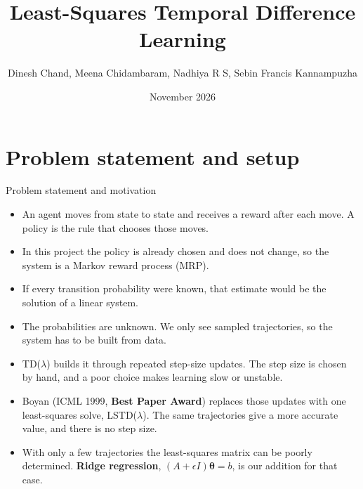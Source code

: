 \documentclass[aspectratio=169,11pt]{beamer}
\title{Least-Squares Temporal Difference Learning}
\author{Dinesh Chand, Meena Chidambaram, Nadhiya R S, Sebin Francis Kannampuzha}
\date{November 2026}
\newcommand{\memberA}{Member A}
\newcommand{\darkbg}{\fill[ink] (current page.south west) rectangle (current page.north east);}
\newcommand{\speaker}[1]{} %
\newcommand{\hl}[1]{\textcolor{accent}{\textbf{#1}}}
\newcommand{\vth}{\bm{\theta}}
\begin{document}
\begin{frame}
\end{frame}

\section{Problem statement and setup}

\begin{frame}{Problem statement and motivation}
  \speaker{\memberA}
  \small
  \begin{itemize}
    \item An agent moves from state to state and receives a reward after each move. A policy is the rule that chooses those moves.
    \item In this project the policy is already chosen and does not change, so the system is a Markov reward process (MRP).
    \item If every transition probability were known, that estimate would be the solution of a linear system.
    \item The probabilities are unknown. We only see sampled trajectories, so the system has to be built from data.
    \item TD($\lambda$) builds it through repeated step-size updates. The step size is chosen by hand, and a poor choice makes learning slow or unstable.
    \item Boyan (ICML 1999, \hl{Best Paper Award}) replaces those updates with one least-squares solve, LSTD($\lambda$). The same trajectories give a more accurate value, and there is no step size.
    \item With only a few trajectories the least-squares matrix can be poorly determined. \hl{Ridge regression}, $(A+\epsilon I)\vth=b$, is our addition for that case.
  \end{itemize}
\end{frame}
\end{document}
